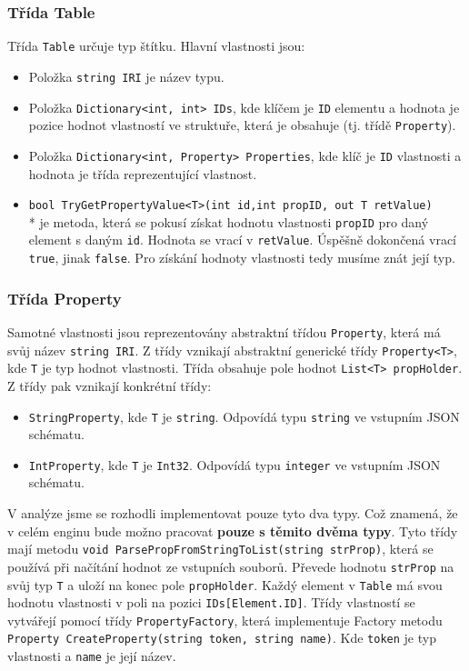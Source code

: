 \subsubsection{Třída Table}

Třída \texttt{Table} určuje typ štítku.
Hlavní vlastnosti jsou:
\begin{itemize}
\item Položka \texttt{string IRI} je název typu.
\item Položka \texttt{Dictionary<int, int> IDs}, kde klíčem je \texttt{ID} elementu a hodnota je pozice hodnot vlastností ve struktuře, která je obsahuje (tj. třídě \texttt{Property}).
\item Položka \texttt{Dictionary<int, Property> Properties}, kde klíč je \texttt{ID} vlastnosti a hodnota je třída reprezentující vlastnost.
\item \texttt{bool TryGetPropertyValue<T>(int id,int propID, out T retValue)}\\* 
je metoda, která se pokusí získat hodnotu vlastnosti \texttt{propID} pro daný element s daným \texttt{id}.
Hodnota se vrací v \texttt{retValue}. Úspěšně dokončená vrací \texttt{true}, jinak \texttt{false}.
Pro získání hodnoty vlastnosti tedy musíme znát její typ.
\end{itemize}

\subsubsection{Třída Property}

Samotné vlastnosti jsou reprezentovány abstraktní třídou \texttt{Property}, která má svůj název \texttt{string IRI}.
Z třídy vznikají abstraktní generické třídy \texttt{Property<T>}, kde \texttt{T} je typ hodnot vlastnosti.
Třída obsahuje pole hodnot \texttt{List<T> propHolder}.
Z třídy pak vznikají konkrétní třídy:
\begin{itemize}
\item \texttt{StringProperty}, kde \texttt{T} je \texttt{string}. Odpovídá typu \texttt{string} ve vstupním JSON schématu.
\item \texttt{IntProperty}, kde \texttt{T} je \texttt{Int32}. Odpovídá typu \texttt{integer} ve vstupním JSON schématu.
\end{itemize}
V analýze jsme se rozhodli implementovat pouze tyto dva typy. 
Což znamená, že v celém enginu bude možno pracovat \textbf{pouze s těmito dvěma typy}.
Tyto třídy mají metodu \texttt{void ParsePropFromStringToList(string strProp)}, která se používá při načítání hodnot ze vstupních souborů.
Převede hodnotu \texttt{strProp} na svůj typ \texttt{T} a uloží na konec pole \texttt{propHolder}.
Každý element v \texttt{Table} má svou hodnotu vlastnosti v poli na pozici \texttt{IDs[Element.ID]}.
Třídy vlastností se vytvářejí pomocí třídy \texttt{PropertyFactory}, která implementuje Factory metodu \citep[str. 107]{patterns} \texttt{Property CreateProperty(string token, string name)}.
Kde \texttt{token} je typ vlastnosti a \texttt{name} je její název.

